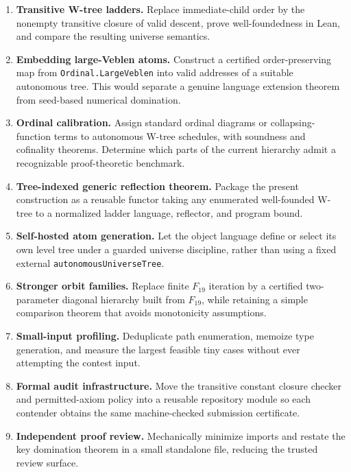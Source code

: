 \documentclass[11pt]{article}
\theoremstyle{definition}
\theoremstyle{remark}
\begin{document}
\begin{enumerate}[leftmargin=2.2em]
\item \textbf{Transitive W-tree ladders.}  Replace immediate-child order by the
  nonempty transitive closure of valid descent, prove well-foundedness in Lean,
  and compare the resulting universe semantics.

\item \textbf{Embedding large-Veblen atoms.}  Construct a certified
  order-preserving map from \nolinkurl{Ordinal.LargeVeblen} into valid addresses
  of a suitable autonomous tree.  This would separate a genuine language
  extension theorem from seed-based numerical domination.

\item \textbf{Ordinal calibration.}  Assign standard ordinal diagrams or
  collapsing-function terms to autonomous W-tree schedules, with soundness and
  cofinality theorems.  Determine which parts of the current hierarchy admit a
  recognizable proof-theoretic benchmark.

\item \textbf{Tree-indexed generic reflection theorem.}  Package the present
  construction as a reusable functor taking any enumerated well-founded W-tree
  to a normalized ladder language, reflector, and program bound.

\item \textbf{Self-hosted atom generation.}  Let the object language define or
  select its own level tree under a guarded universe discipline, rather than
  using a fixed external \texttt{autonomousUniverseTree}.

\item \textbf{Stronger orbit families.}  Replace finite $F_{19}$ iteration by
  a certified two-parameter diagonal hierarchy built from $F_{19}$, while
  retaining a simple comparison theorem that avoids monotonicity assumptions.

\item \textbf{Small-input profiling.}  Deduplicate path enumeration, memoize
  type generation, and measure the largest feasible tiny cases without ever
  attempting the contest input.

\item \textbf{Formal audit infrastructure.}  Move the transitive constant
  closure checker and permitted-axiom policy into a reusable repository module
  so each contender obtains the same machine-checked submission certificate.

\item \textbf{Independent proof review.}  Mechanically minimize imports and
  restate the key domination theorem in a small standalone file, reducing the
  trusted review surface.
\end{enumerate}
\end{document}
